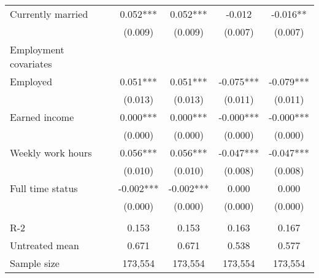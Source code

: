 \begin{tabular}{lcccc}
 Currently married   & 0.052***   & 0.052***   & -0.012   & -0.016**  \\
 & (0.009)   & (0.009)   & (0.007)   & (0.007)  \\
 Employment covariates  \\
 Employed   & 0.051***   & 0.051***   & -0.075***   & -0.079***  \\
 & (0.013)   & (0.013)   & (0.011)   & (0.011)  \\
 Earned income   & 0.000***   & 0.000***   & -0.000***   & -0.000***  \\
 & (0.000)   & (0.000)   & (0.000)   & (0.000)  \\
 Weekly work hours   & 0.056***   & 0.056***   & -0.047***   & -0.047***  \\
 & (0.010)   & (0.010)   & (0.008)   & (0.008)  \\
 Full time status   & -0.002***   & -0.002***   & 0.000   & 0.000  \\
 & (0.000)   & (0.000)   & (0.000)   & (0.000)  \\
\\
R-2 & 0.153 & 0.153 & 0.163 & 0.167 \\
Untreated mean & 0.671 & 0.671 & 0.538 & 0.577 \\
Sample size & 173,554 & 173,554 & 173,554 & 173,554 \\
\bottomrule
\bottomrule
\end{tabular}